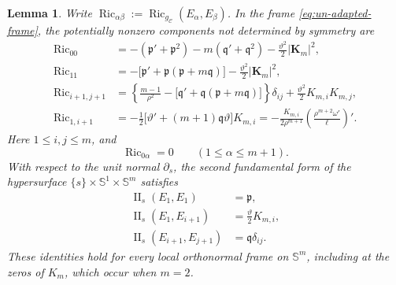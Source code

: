 \documentclass[11pt,reqno]{amsart}
\newtheorem{lemma}[theorem]{Lemma}
\theoremstyle{definition}
\numberwithin{equation}{section}
\DeclareMathOperator{\Ric}{Ric}
\DeclareMathOperator{\II}{II}
\begin{document}
\begin{lemma}
\label{lem:un-ricci}
Write
\(\Ric_{\alpha\beta}:=\Ric_{g_{\mathcal C}}(E_\alpha,E_\beta)\).  In the frame
\eqref{eq:un-adapted-frame}, the potentially nonzero components not
determined by symmetry are
\begin{align}
 \Ric_{00}
  &=-(\mathfrak p'+\mathfrak p^2)-m(\mathfrak q'+\mathfrak q^2)
    -\frac{\vartheta^2}{2}\lvert\mathbf K_m\rvert^2,
  \label{eq:un-ric00}\\
 \Ric_{11}
  &=-\bigl[\mathfrak p'+\mathfrak p(\mathfrak p+m\mathfrak q)\bigr]
    -\frac{\vartheta^2}{2}\lvert\mathbf K_m\rvert^2,
  \label{eq:un-ric11}\\
 \Ric_{i+1,j+1}
  &=\left\{\frac{m-1}{\rho^2}
    -\bigl[\mathfrak q'+\mathfrak q(\mathfrak p+m\mathfrak q)\bigr]\right\}\delta_{ij}
    +\frac{\vartheta^2}{2}K_{m,i}K_{m,j},
  \label{eq:un-ricij}\\
 \Ric_{1,i+1}
  &=-\frac12\bigl[\vartheta'+(m+1)\mathfrak q\vartheta\bigr]K_{m,i}
   =-\frac{K_{m,i}}{2\rho^{m+1}}
       \left(\frac{\rho^{m+2}\omega'}{\ell}\right)'.
  \label{eq:un-ric1i}
\end{align}
Here \(1\le i,j\le m\), and
\[
 \Ric_{0\alpha}=0\qquad(1\le\alpha\le m+1).
\]
With respect to the unit normal \(\partial_s\),
the second fundamental form of the hypersurface
\(\{s\}\times\mathbb S^1\times\mathbb S^m\) satisfies
\begin{align}
 \II_s(E_1,E_1)&=\mathfrak p,\nonumber\\
 \II_s(E_1,E_{i+1})&=\frac{\vartheta}{2}K_{m,i},
 \label{eq:un-shape}\\
 \II_s(E_{i+1},E_{j+1})&=\mathfrak q\delta_{ij}.\nonumber
\end{align}
These identities hold for every local orthonormal frame on
\(\mathbb S^m\), including at the zeros of \(K_m\), which occur when
\(m=2\).
\end{lemma}
\end{document}
